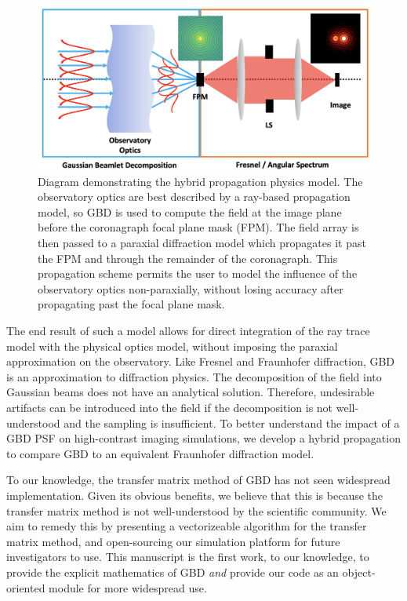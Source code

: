 \begin{figure}[H]
    \centering
    \includegraphics[width=\textwidth]{hybridprop2.png}
    \caption{Diagram demonstrating the hybrid propagation physics model. The observatory optics are best described by a ray-based propagation model, so GBD is used to compute the field at the image plane before the coronagraph focal plane mask (FPM). The field array is then passed to a paraxial diffraction model which propagates it past the FPM and through the remainder of the coronagraph. This propagation scheme permits the user to model the influence of the observatory optics non-paraxially, without losing accuracy after propagating past the focal plane mask.}
    \label{fig:hybridpropdiagram}
\end{figure}

The end result of such a model allows for direct integration of the ray trace model with the physical optics model, without imposing the paraxial approximation on the observatory. Like Fresnel and Fraunhofer diffraction, GBD is an approximation to diffraction physics. The decomposition of the field into Gaussian beams does not have an analytical solution. Therefore, undesirable artifacts can be introduced into the field if the decomposition is not well-understood and the sampling is insufficient\cite{Ashcraft2020}. To better understand the impact of a GBD PSF on high-contrast imaging simulations, we develop a hybrid propagation  to compare GBD to an equivalent Fraunhofer diffraction model.

To our knowledge, the transfer matrix method of GBD has not seen widespread implementation. Given its obvious benefits, we believe that this is because the transfer matrix method is not well-understood by the scientific community. We aim to remedy this by presenting a vectorizeable algorithm for the transfer matrix method, and open-sourcing our simulation platform for future investigators to use. This manuscript is the first work, to our knowledge, to provide the explicit mathematics of GBD \emph{and} provide our code as an object-oriented module for more widespread use. 

